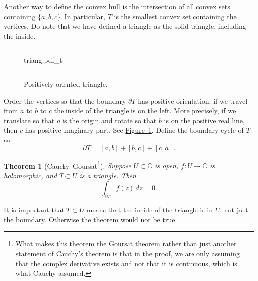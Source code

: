 \documentclass[12pt,openany]{book}
\newcommand{\C}{{\mathbb{C}}}
\theoremstyle{plain}
\newtheorem{thm}{Theorem}[section]
\theoremstyle{remark}
\theoremstyle{definition}
\newenvironment{myfig}{%
\begin{figure}[h!t]
\noindent\rule{\textwidth}{0.5pt}\vspace{12pt}\par\centering}%
{\par\noindent\rule{\textwidth}{0.5pt}
\end{figure}}
\theoremstyle{exercise}
\theoremstyle{example}
\newcommand{\figureref}[1]{\hyperref[#1]{Figure~\ref*{#1}}}
\begin{document}
Another way to define
the convex hull is the intersection of all convex sets containing $\{ a,b,c \}$.
In particular, $T$ is the smallest convex set containing the vertices.
Do note that we have defined a triangle as the solid triangle, including
the inside.

\begin{myfig}
{triang.pdf_t}
\caption{Positively oriented triangle.%
\label{fig:triang}}
\end{myfig}
Order the vertices so that the boundary $\partial T$ has positive orientation;
if we travel from $a$ to $b$ to $c$ the inside of the triangle 
is on the left.  More precisely, if we translate so that $a$ is
the origin and rotate so that $b$ is on the positive real line, then $c$
has positive imaginary part.  See \figureref{fig:triang}.  Define the boundary cycle
of $T$ as
\begin{equation*}
\partial T = [a,b] + [b,c] + [c,a] .
\end{equation*}

\begin{thm}[Cauchy--Goursat\footnote{%
What makes this theorem the Goursat theorem
rather than just another statement of Cauchy's theorem
is that in the proof, we are only assuming that the complex derivative exists
and not that it is continuous, which is what Cauchy
assumed.}]\label{thm:cauchygoursat}
\pagebreak[2]
Suppose $U \subset \C$ is open, $f \colon U \to \C$ is
holomorphic,
and $T \subset U$ is a triangle.  Then
\begin{equation*}
\int_{\partial T} f(z) \, dz = 0 .
\end{equation*}
\end{thm}

It is important that $T \subset U$ means that the inside
of the triangle is in $U$, not just the boundary.  Otherwise the theorem
would not be true.
\end{document}
